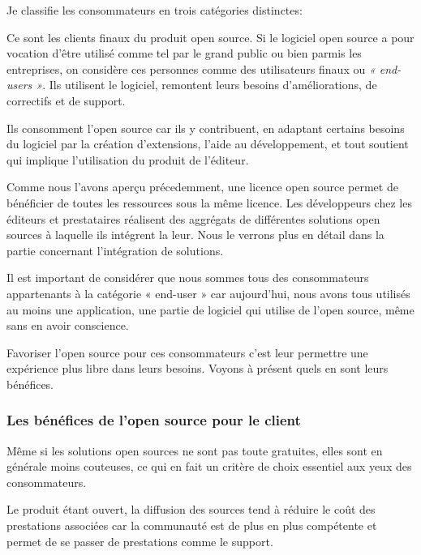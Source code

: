 				Je classifie les consommateurs en trois catégories distinctes:
				\begin{description}[font=\color{burntorange}]
					\item[Les end-users:] Ce sont les clients finaux du produit open source. Si le logiciel open source a pour vocation d'être utilisé comme tel par le grand public ou bien parmis les entreprises, on considère ces personnes comme des utilisateurs finaux ou \textit{« end-users »}. Ils utilisent le logiciel, remontent leurs besoins d'améliorations, de correctifs et de support.
					\item[Les contributeurs et la communauté:] Ils consomment l'open source car ils y contribuent, en adaptant certains besoins du logiciel par la création d'extensions, l'aide au développement, et tout soutient qui implique l'utilisation du produit de l'éditeur.
					\item[Les autres éditeurs et prestataires:] Comme nous l'avons aperçu précedemment, une licence open source permet de bénéficier de toutes les ressources sous la même licence. Les développeurs chez les éditeurs et prestataires réalisent des aggrégats de différentes solutions open sources à laquelle ils intégrent la leur. Nous le verrons plus en détail dans la partie concernant l'intégration de solutions.
				\end{description}

				Il est important de considérer que nous sommes tous des consommateurs appartenants à la catégorie « end-user » car aujourd'hui, nous avons tous utilisés au moins une application, une partie de logiciel qui utilise de l'open source, même sans en avoir conscience.

				Favoriser l'open source pour ces consommateurs c'est leur permettre une expérience plus libre dans leurs besoins. Voyons à présent quels en sont leurs bénéfices.
			
			\subsubsection{Les bénéfices de l'open source pour le client}

				Même si les solutions open sources ne sont pas toute gratuites, elles sont en générale moins couteuses, ce qui en fait un critère de choix essentiel aux yeux des consommateurs.

				Le produit étant ouvert, la diffusion des sources tend à réduire le coût des prestations associées car la communauté est de plus en plus compétente et permet de se passer de prestations comme le support.

